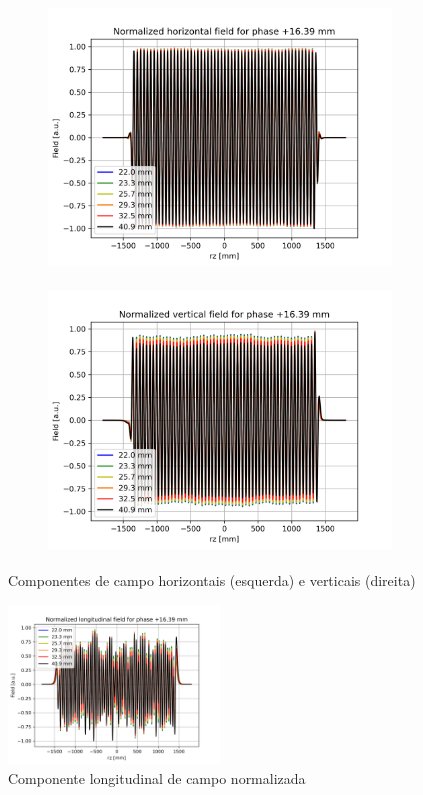 \documentclass[a4paper,12pt]{article}
\begin{document}
\begin{figure}[H]
\begin{subfigure}{0.5\textwidth}
\includegraphics[width=0.9\linewidth, height=7cm]{figs/phase16 Bx.png} 
\label{fig:subim116}
\end{subfigure}
\begin{subfigure}{0.5\textwidth}
\includegraphics[width=0.9\linewidth, height=7cm]{figs/phase16 By.png}
\label{fig:subim216}
\end{subfigure}
\caption{Componentes de campo horizontais (esquerda) e verticais (direita)}
\label{fig:bx_by_16}
\end{figure}


\begin{figure}[H]
\begin{center}
\includegraphics[width=0.5\textwidth]{figs/phase16 Bz.png}
\caption{Componente longitudinal de campo normalizada}
\label{fig:bz_16}
\end{center}
\end{figure}
\end{document}
